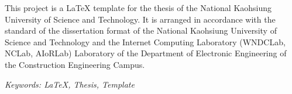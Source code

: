 \renewcommand{\abstractname}{Abstract}
\clearpage
{}
\addchaptertocentry{\abstractname}
\begin{engabstract}

    This project is a LaTeX template for the thesis of the National Kaohsiung University of Science and Technology.
    It is arranged in accordance with the standard of the dissertation format of the National Kaohsiung University of Science and Technology and the Internet Computing Laboratory (WNDCLab, NCLab, AIoRLab) Laboratory of the Department of Electronic Engineering of the Construction Engineering Campus.

\hbox{}
\it{Keywords: LaTeX, Thesis, Template}
\end{engabstract}